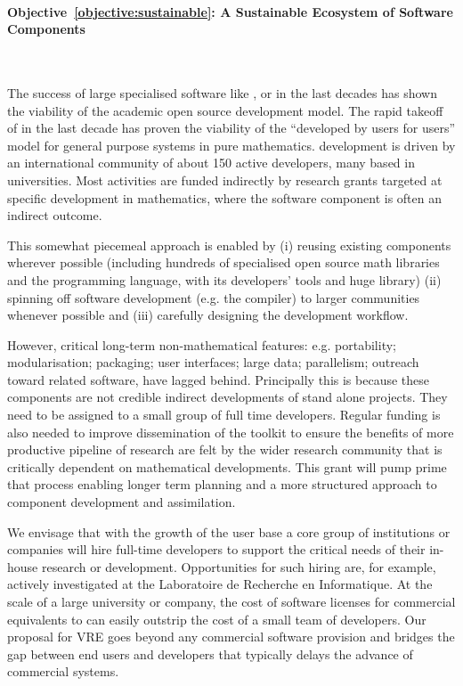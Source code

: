 \documentclass[noworkareas,deliverables,\classoptions]{euproposal}       %
\begin{document}
\begin{proposal}
\paragraph{Objective~\ref{objective:sustainable}: A Sustainable
  Ecosystem of Software Components}\

The success of large specialised software like \PariGP, \Singular or
\GAP in the last decades has shown the viability of the academic open
source development model. The rapid takeoff of \Sage in the last
decade has proven the viability of the ``developed by users for
users'' model for general purpose systems in pure mathematics.  \Sage
development is driven by an international community of about 150
active developers, many based in universities.  Most activities are
funded indirectly by research grants targeted at specific development
in mathematics, where the software component is often an indirect
outcome.

This somewhat piecemeal approach is enabled by (i) reusing existing
components wherever possible (including hundreds of specialised open
source math libraries and the \Python programming language, with its
developers' tools and huge library) (ii) spinning off software
development (e.g. the \Cython compiler) to larger communities whenever
possible and (iii) carefully designing the development workflow.

However, critical long-term non-mathematical features:
e.g. portability; modularisation; packaging; user interfaces; large
data; parallelism; outreach toward related software, have lagged
behind. Principally this is because these components are not credible
indirect developments of stand alone projects. They need to be
assigned to a small group of full time developers. Regular funding is
also needed to improve dissemination of the toolkit to ensure the
benefits of more productive pipeline of research are felt by the wider
research community that is critically dependent on mathematical
developments. This grant will pump prime that process enabling longer
term planning and a more structured approach to component development
and assimilation.

We envisage that with the growth of the user base a core group of
institutions or companies will hire full-time developers to support
the critical needs of their in-house research or development.
Opportunities for such hiring are, for example, actively investigated
at the Laboratoire de Recherche en Informatique. At the scale of a
large university or company, the cost of software licenses for
commercial equivalents to \Sage can easily outstrip the cost of a
small team of developers. Our proposal for VRE goes beyond any
commercial software provision and bridges the gap between end users
and developers that typically delays the advance of commercial
systems.


\end{proposal}
\end{document}
